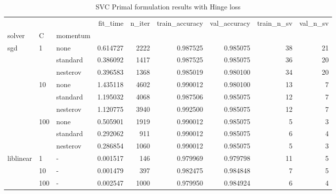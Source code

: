 \begin{table}[H]
\centering
\caption{SVC Primal formulation results with Hinge loss}
\label{primal_svc_hinge_cv_results}
\begin{tabular}{lllrrrrrr}
\toprule
          &     &   &  fit\_time &  n\_iter &  train\_accuracy &  val\_accuracy &  train\_n\_sv &  val\_n\_sv \\
solver & C & momentum &           &         &                 &               &             &           \\
\midrule
sgd & 1   & none &  0.614727 &    2222 &        0.987525 &      0.985075 &          38 &        21 \\
          &     & standard &  0.386092 &    1417 &        0.987525 &      0.985075 &          36 &        20 \\
          &     & nesterov &  0.396583 &    1368 &        0.985019 &      0.980100 &          34 &        20 \\
          & 10  & none &  1.435118 &    4602 &        0.990012 &      0.980100 &          13 &         7 \\
          &     & standard &  1.195032 &    4068 &        0.987506 &      0.985075 &          12 &         7 \\
          &     & nesterov &  1.120775 &    3940 &        0.992500 &      0.985075 &          12 &         7 \\
          & 100 & none &  0.505901 &    1919 &        0.990012 &      0.985075 &           5 &         3 \\
          &     & standard &  0.292062 &     911 &        0.990012 &      0.985075 &           6 &         4 \\
          &     & nesterov &  0.286854 &    1060 &        0.990012 &      0.985075 &           5 &         3 \\
liblinear & 1   & - &  0.001517 &     146 &        0.979969 &      0.979798 &          11 &         5 \\
          & 10  & - &  0.001479 &     397 &        0.982475 &      0.984848 &           7 &         5 \\
          & 100 & - &  0.002547 &    1000 &        0.979950 &      0.984924 &           6 &         4 \\
\bottomrule
\end{tabular}
\end{table}
